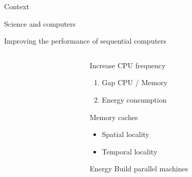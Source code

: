 \documentclass[xcolor={usenames,dvipsnames},hyperref={pdfusetitle}]{beamer}
\begin{document}
\begin{section}{Context}

\begin{frame}{Science and computers}
    
\end{frame}

\begin{frame}{Improving the performance of sequential computers}
    \begin{columns}
        \begin{column}{.45\textwidth}
            \centering
            
            \begin{block}{}
                \centering
            \end{block}
        \end{column}
        \begin{column}{.45\textwidth}
            \pause
            \begin{block}{Increase CPU frequency}
                \begin{enumerate}
                    \item<alert@1-> Gap CPU / Memory
                    \item<alert@1-> Energy consumption
                \end{enumerate}
            \end{block}
            \pause
            \begin{exampleblock}{Memory caches}
                \begin{itemize}
                    \item Spatial locality
                    \item Temporal locality
                \end{itemize}
            \end{exampleblock}
            \pause
            \begin{exampleblock}{Energy}
                Build parallel machines
            \end{exampleblock}
        \end{column}
    \end{columns}
\end{frame}


\end{section}
\end{document}
